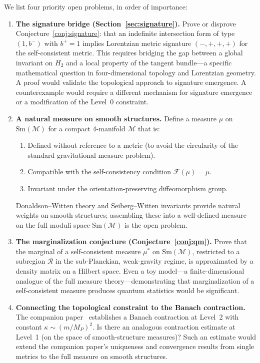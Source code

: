 \documentclass[12pt,a4paper]{article}
\theoremstyle{definition}
\theoremstyle{remark}
\begin{document}
We list four priority open problems, in order of importance:

\begin{enumerate}

\item \textbf{The signature bridge (Section~\ref{sec:signature}).}
Prove or disprove Conjecture~\ref{conj:signature}: that an indefinite
intersection form of type $(1,b^-)$ with $b^+ = 1$ implies Lorentzian metric
signature $(-,+,+,+)$ for the self-consistent metric. This requires bridging
the gap between a global invariant on $H_2$ and a local property of the tangent
bundle---a specific mathematical question in four-dimensional topology and
Lorentzian geometry. A proof would
validate the topological approach to signature emergence. A counterexample would
require a different mechanism for signature emergence or a modification of the
Level~0 constraint.

\item \textbf{A natural measure on smooth structures.}
Define a measure $\mu$ on $\mathrm{Sm}(\mathcal{M})$ for a compact
4-manifold $\mathcal{M}$ that is:
\begin{enumerate}
\item Defined without reference to a metric (to avoid the circularity of the
standard gravitational measure problem).
\item Compatible with the self-consistency condition $\mathcal{F}(\mu) = \mu$.
\item Invariant under the orientation-preserving diffeomorphism group.
\end{enumerate}
Donaldson--Witten theory and Seiberg--Witten invariants provide natural weights
on smooth structures; assembling these into a well-defined measure on the full
moduli space $\mathrm{Sm}(\mathcal{M})$ is the open problem.

\item \textbf{The marginalization conjecture (Conjecture~\ref{conj:qm}).}
Prove that the marginal of a self-consistent measure $\mu^*$ on
$\mathrm{Sm}(\mathcal{M})$, restricted to a subregion $\mathcal{R}$ in
the sub-Planckian, weak-gravity regime, is approximated by a density matrix
on a Hilbert space. Even a toy model---a finite-dimensional analogue of the
full measure theory---demonstrating that marginalization of a self-consistent
measure produces quantum statistics would be significant.

\item \textbf{Connecting the topological constraint to the Banach contraction.}
The companion paper~\cite{fixed_point} establishes a Banach contraction at
Level~2 with constant $\kappa \sim (m/M_P)^2$. Is there an analogous
contraction estimate at Level~1 (on the space of smooth-structure measures)?
Such an estimate would extend the companion paper's uniqueness and convergence
results from single metrics to the full measure on smooth structures.

\end{enumerate}
\end{document}
